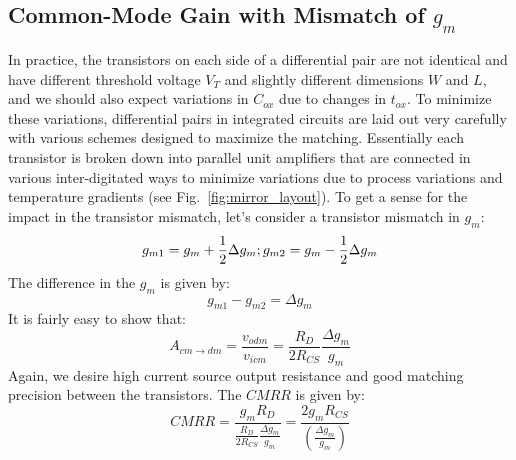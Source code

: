 \subsection{Common-Mode Gain with Mismatch of $g_m$}
In practice, the transistors on each side of a differential pair are not identical and have different threshold voltage $V_T$ and slightly different dimensions $W$ and $L$, and we should also expect variations in $C_{ox}$ due to changes in $t_{ox}$.  To minimize these variations, differential pairs in integrated circuits are laid out very carefully with various schemes designed to maximize the matching.  Essentially each transistor is broken down into parallel unit amplifiers that are connected in various inter-digitated ways to minimize variations due to process variations and temperature gradients (see Fig.~\ref{fig:mirror_layout}).
To get a sense for the impact in the transistor mismatch, let's consider a transistor mismatch in $g_m$:
\begin{equation} 
	{g_{m1}} = {g_m} + \frac{1}{2}\Delta {g_m};{\rm{         }}{g_{m2}} = {g_m} - \frac{1}{2}\Delta {g_m}
\end{equation}
The difference in the $g_m$ is given by:
\begin{equation}
	{g_{m1}} - {g_{m2}} = \Delta {g_m}
\end{equation}
It is fairly easy to show that:
\begin{equation}
	{A_{cm \to dm }} = \frac{{{v_{odm}}}}{{{v_{icm}}}} = \frac{{{R_D}}}{{2{R_{CS}}}}\frac{{\Delta {g_m}}}{{{g_m}}}
\end{equation}
Again, we desire high current source output resistance and good matching precision between the transistors.  The $CMRR$ is given by:
\begin{equation}
	CMRR  =  \frac{{{g_m}{R_D}}}{{\frac{{{R_D}}}{{2{R_{CS}}}}\frac{{\Delta {g_m}}}{{{g_m}}}}} = \frac{{2{g_m}{R_{CS}}}}{{\left( {\frac{{\Delta {g_m}}}{{{g_m}}}} \right)}} 
\end{equation}
